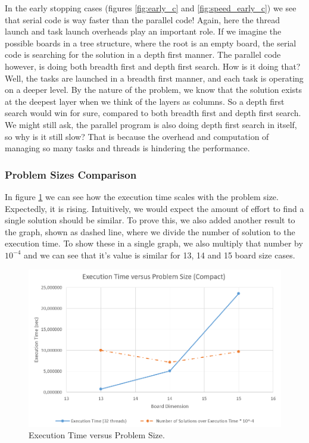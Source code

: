 \documentclass[11pt,reqno]{amsart}
\begin{document}
In the early stopping cases (figures \ref{fig:early_c} and \ref{fig:speed_early_c}) we see that serial code is way faster than the parallel code! Again, here the thread launch and task launch overheads play an important role. If we imagine the possible boards in a tree structure, where the root is an empty board, the serial code is searching for the solution in a depth first manner. The parallel code however, is doing both breadth first and depth first search. How is it doing that? Well, the tasks are launched in a breadth first manner, and each task is operating on a deeper level. By the nature of the problem, we know that the solution exists at the deepest layer when we think of the layers as columns. So a depth first search would win for sure, compared to both breadth first and depth first search. We might still ask, the parallel program is also doing depth first search in itself, so why is it still slow? That is because the overhead and computation of managing so many tasks and threads is hindering the performance.

\subsubsection{Problem Sizes Comparison}

In figure \ref{fig:size_c} we can see how the execution time scales with the problem size. Expectedly, it is rising. Intuitively, we would expect the amount of effort to find a single solution should be similar. To prove this, we also added another result to the graph, shown as dashed line, where we divide the number of solution to the execution time. To show these in a single graph, we also multiply that number by $10^{-4}$ and we can see that it's value is similar for 13, 14 and 15 board size cases.

\begin{figure}[h]
\centering
\includegraphics[width=0.75\linewidth]{problem_size_compact.png}
\caption{Execution Time versus Problem Size.}
\label{fig:size_c}
\end{figure}
\end{document}
